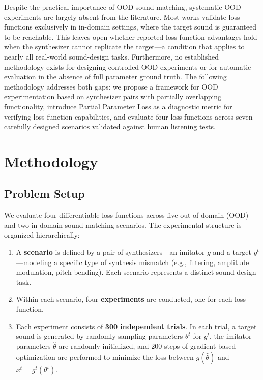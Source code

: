 \documentclass[10pt]{article} %
\newcommand{\todo}[1]{\textcolor{red}{#1}}
\begin{document}
Despite the practical importance of OOD sound-matching, systematic OOD experiments are largely absent from the literature. Most works validate loss functions exclusively in in-domain settings, where the target sound is guaranteed to be reachable. This leaves open whether reported loss function advantages hold when the synthesizer cannot replicate the target---a condition that applies to nearly all real-world sound-design tasks. Furthermore, no established methodology exists for designing controlled OOD experiments or for automatic evaluation in the absence of full parameter ground truth. The following methodology addresses both gaps: we propose a framework for OOD experimentation based on synthesizer pairs with partially overlapping functionality, introduce Partial Parameter Loss as a diagnostic metric for verifying loss function capabilities, and evaluate four loss functions across seven carefully designed scenarios validated against human listening tests.


\section{Methodology}
\label{sec:methodology}
\subsection{Problem Setup}
We evaluate four differentiable loss functions across five out-of-domain (OOD) and two in-domain sound-matching scenarios. The experimental structure is organized hierarchically:

\begin{enumerate}
    \item A \textbf{scenario} is defined by a pair of synthesizers---an imitator $g$ and a target $g^t$---modeling a specific type of synthesis mismatch (e.g., filtering, amplitude modulation, pitch-bending). Each scenario represents a distinct sound-design task.
    
    \item Within each scenario, four \textbf{experiments} are conducted, one for each loss function.
    
    \item Each experiment consists of \textbf{300 independent trials}. In each trial, a target sound is generated by randomly sampling parameters $\theta^t$ for $g^t$, the imitator parameters $\hat{\theta}$ are randomly initialized, and 200 steps of gradient-based optimization are performed to minimize the loss between $g(\hat{\theta})$ and $x^t = g^t(\theta^t)$.
\end{enumerate}
\end{document}
